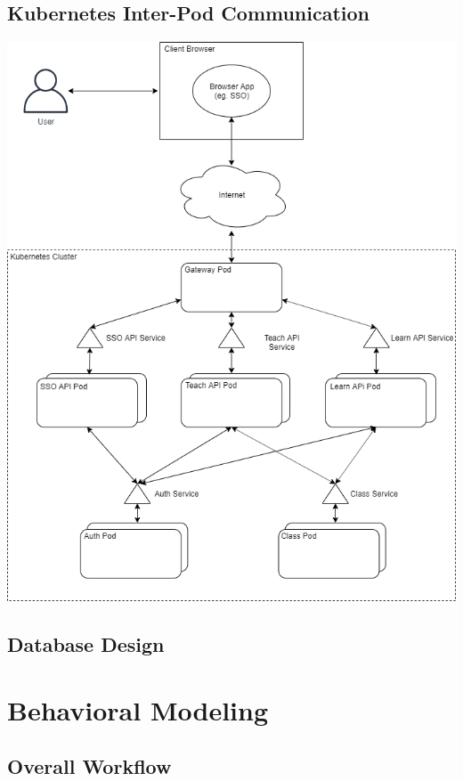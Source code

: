 \documentclass[12pt]{article}
\begin{document}
    \subsection{Kubernetes Inter-Pod Communication}
        \begin{center}\includegraphics[width=\textwidth]{images/pod-inter-coms.png}\end{center}

    \subsection{Database Design}

\section{Behavioral Modeling}

    \subsection{Overall Workflow}
\end{document}
